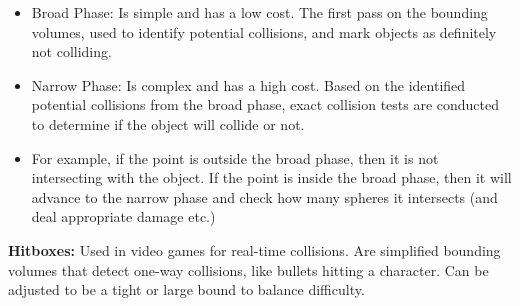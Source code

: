 \documentclass[a4paper,10pt]{article}
\begin{document}
\begin{itemize}
\item \textcolor{Melon}{Broad Phase:} Is simple and has a low cost. The first pass on the bounding volumes, used to identify potential collisions, and mark objects as definitely not colliding. 
\item \textcolor{Melon}{Narrow Phase:} Is complex and has a high cost. Based on the identified potential collisions from the broad phase, exact collision tests are conducted to determine if the object will collide or not. 
\item For example, if the point is outside the broad phase, then it is not intersecting with the object. If the point is inside the broad phase, then it will advance to the narrow phase and check how many spheres it intersects (and deal appropriate damage etc.)
\end{itemize}
\textcolor{Melon}{\textbf{Hitboxes:}} Used in video games for real-time collisions. Are simplified bounding volumes that detect one-way collisions, like bullets hitting a character. Can be adjusted to be a tight or large bound to balance difficulty. \\\\

\newpage 
\end{document}
